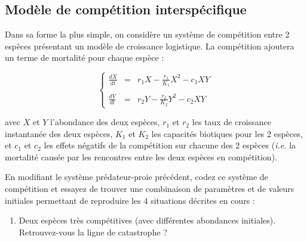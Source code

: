 \documentclass[
  french,
  a4paper,
  DIV=11,
  numbers=noendperiod,
  oneside]{scrreprt}
\providecommand{\tightlist}{%
  \setlength{\itemsep}{0pt}\setlength{\parskip}{0pt}}
\begin{document}
\begin{tcolorbox}
\section{Modèle de compétition interspécifique}\label{sec-compet}

Dans sa forme la plus simple, on considère un système de compétition
entre 2 espèces présentant un modèle de croissance logistique. La
compétition ajoutera un terme de mortalité pour chaque espèce :

\[
    \left\{
    \begin{array}{rcl}
        \displaystyle \frac{dX}{dt} & = & r_1X - \frac{r_1}{K_1}X^2 - c_1XY \\
        & & \\
        \displaystyle \frac{dY}{dt} & = & r_2Y - \frac{r_2}{K_2}Y^2 - c_2XY
    \end{array}
    \right.
\]

avec \(X\) et \(Y\) l'abondance des deux espèces, \(r_1\) et \(r_2\) les
taux de croissance instantanée des deux espèces, \(K_1\) et \(K_2\) les
capacités biotiques pour les 2 espèces, et \(c_1\) et \(c_2\) les effets
négatifs de la compétition sur chacune des 2 espèces (\emph{i.e.} la
mortalité causée par les rencontres entre les deux espèces en
compétition).

En modifiant le système prédateur-proie précédent, codez ce système de
compétition et essayez de trouver une combinaison de paramètres et de
valeurs initiales permettant de reproduire les 4 situations décrites en
cours :

\begin{enumerate}
\def\labelenumi{\arabic{enumi}.}
\tightlist
\item
  Deux espèces très compétitives (avec différentes abondances
  initiales). Retrouvez-vous la ligne de catastrophe ?
\end{enumerate}

{
\makeatletter
\def\LT@makecaption#1#2#3{%
  \noalign{\smash{\hbox{\kern\textwidth\rlap{\kern\marginparsep
  \parbox[t]{\marginparwidth}{%
    \footnotesize{%
      \vspace{(1.1\baselineskip)}
    #1{#2: }\ignorespaces #3}}}}}}%
    }
\makeatother

\begin{figure}[H]



\end{figure}}
\end{tcolorbox}
\end{document}
